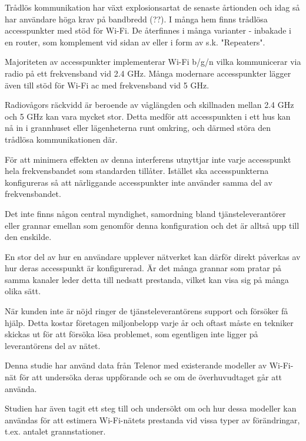 Trådlös kommunikation har växt explosionsartat de senaste årtionden och idag så har användare höga krav på bandbredd (??). I många hem finns trådlösa accesspunkter med stöd för Wi-Fi. De återfinnes i många varianter - inbakade i en router, som komplement vid sidan av eller i form av s.k. "Repeaters".

Majoriteten av accesspunkter implementerar Wi-Fi b/g/n vilka kommunicerar via radio på ett frekvensband vid 2.4 GHz. Många modernare accesspunkter lägger även till stöd för Wi-Fi ac med frekvensband vid 5 GHz.

Radiovågors räckvidd är beroende av våglängden och skillnaden mellan 2.4 GHz och 5 GHz kan vara mycket stor. Detta medför att accesspunkten i ett hus kan nå in i grannhuset eller lägenheterna runt omkring, och därmed störa den trådlösa kommunikationen där.

För att minimera effekten av denna interferens utnyttjar inte varje accesspunkt hela frekvensbandet som standarden tillåter. Istället ska accesspunkterna konfigureras så att närliggande accesspunkter inte använder samma del av frekvensbandet.

Det inte finns någon central myndighet, samordning bland tjänsteleverantörer eller grannar emellan som genomför denna konfiguration och det är alltså upp till den enskilde.

En stor del av hur en användare upplever nätverket kan därför direkt påverkas av hur deras accesspunkt är konfigurerad. Är det många grannar som pratar på samma kanaler leder detta till nedsatt prestanda, vilket kan visa sig på många olika sätt.

När kunden inte är nöjd ringer de tjänsteleverantörens support och försöker få hjälp. Detta kostar företagen miljonbelopp varje år och oftast måste en tekniker skickas ut för att försöka lösa problemet, som egentligen inte ligger på leverantörens del av nätet.

Denna studie har använd data från Telenor med existerande modeller av Wi-Fi-nät för att undersöka deras uppförande och se om de överhuvudtaget går att använda. 

Studien har även tagit ett steg till och undersökt om och hur dessa modeller kan användas för att estimera Wi-Fi-nätets prestanda vid vissa typer av förändringar, t.ex. antalet grannstationer.
